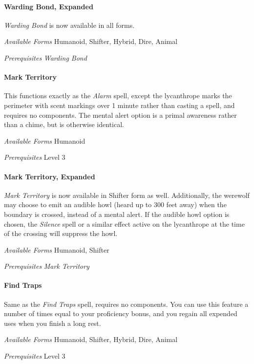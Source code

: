 \documentclass[twocolumn]{dndbook}
\begin{document}
\paragraph*{Warding Bond, Expanded}
\emph{Warding Bond} is now available in all forms.\par
\emph{Available Forms} Humanoid, Shifter, Hybrid, Dire, Animal\par
\emph{Prerequisites} \emph{Warding Bond}\par

\paragraph*{Mark Territory}
This functions exactly as the \emph{Alarm} spell, except the lycanthrope marks the perimeter with scent markings over 1 minute rather than casting a spell, and requires no components.
The mental alert option is a primal awareness rather than a chime, but is otherwise identical.\par
\emph{Available Forms} Humanoid\par
\emph{Prerequisites} Level 3\par

\paragraph*{Mark Territory, Expanded}
\emph{Mark Territory} is now available in Shifter form as well.
Additionally, the werewolf may choose to emit an audible howl (heard up to 300 feet away) when the boundary is crossed, instead of a mental alert.
If the audible howl option is chosen, the \emph{Silence} spell or a similar effect active on the lycanthrope at the time of the crossing will suppress the howl.\par
\emph{Available Forms} Humanoid, Shifter\par
\emph{Prerequisites} \emph{Mark Territory}\par

\paragraph*{Find Traps}
Same as the \emph{Find Traps} spell, requires no components.
You can use this feature a number of times equal to your proficiency bonus, and you regain all expended uses when you finish a long rest.\par
\emph{Available Forms} Humanoid, Shifter, Hybrid, Dire, Animal\par
\emph{Prerequisites} Level 3\par
\end{document}

